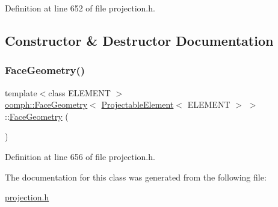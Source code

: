 Definition at line 652 of file projection.\+h.



\subsection{Constructor \& Destructor Documentation}
\mbox{\label{classoomph_1_1FaceGeometry_3_01ProjectableElement_3_01ELEMENT_01_4_01_4_a62c7dbbd61666c35f66cb028468bd110}} 
\subsubsection{\texorpdfstring{Face\+Geometry()}{FaceGeometry()}}
{\footnotesize\ttfamily template$<$class E\+L\+E\+M\+E\+NT $>$ \\
\hyperlink{classoomph_1_1FaceGeometry}{oomph\+::\+Face\+Geometry}$<$ \hyperlink{classoomph_1_1ProjectableElement}{Projectable\+Element}$<$ E\+L\+E\+M\+E\+NT $>$ $>$\+::\hyperlink{classoomph_1_1FaceGeometry}{Face\+Geometry} (\begin{DoxyParamCaption}{ }\end{DoxyParamCaption})\hspace{0.3cm}{\ttfamily [inline]}}



Definition at line 656 of file projection.\+h.



The documentation for this class was generated from the following file\+:\begin{DoxyCompactItemize}
\item 
\hyperlink{projection_8h}{projection.\+h}\end{DoxyCompactItemize}
